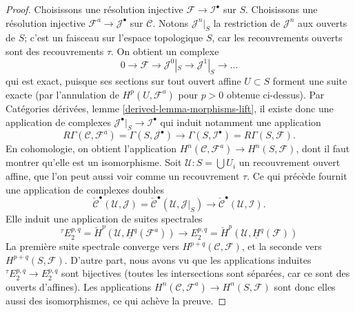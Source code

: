 \begin{proof}
\medskip\noindent
Choisissons une résolution injective
$\mathcal{F} \to \mathcal{I}^\bullet$ sur $S$. Choisissons une
résolution injective $\mathcal{F}^a \to \mathcal{J}^\bullet$
sur $\mathcal{C}$.
Notons $\mathcal{J}^n|_S$ la restriction de $\mathcal{J}^n$ aux ouverts
de $S$; c'est un faisceau sur l'espace topologique $S$, car les
recouvrements ouverts sont des recouvrements $\tau$. On obtient un
complexe
$$
0 \to \mathcal{F} \to \mathcal{J}^0|_S \to \mathcal{J}^1|_S \to \ldots
$$
qui est exact, puisque ses sections sur tout ouvert affine $U \subset S$
forment une suite exacte (par l'annulation de
$H^p(U, \mathcal{F}^a)$ pour $p > 0$ obtenue ci-dessus). Par Catégories
dérivées, lemme \ref{derived-lemma-morphisms-lift}, il existe donc une
application de complexes
$\mathcal{J}^\bullet|_S \to \mathcal{I}^\bullet$ qui induit notamment
une application
$$
R\Gamma(\mathcal{C}, \mathcal{F}^a)
=
\Gamma(S, \mathcal{J}^\bullet)
\longrightarrow
\Gamma(S, \mathcal{I}^\bullet)
=
R\Gamma(S, \mathcal{F}).
$$
En cohomologie, on obtient l'application
$H^n(\mathcal{C}, \mathcal{F}^a) \to H^n(S, \mathcal{F})$, dont il faut
montrer qu'elle est un isomorphisme. Soit
$\mathcal{U} : S = \bigcup U_i$ un recouvrement ouvert affine, que l'on
peut aussi voir comme un recouvrement $\tau$. Ce qui précède fournit une
application de complexes doubles
$$
\check{\mathcal{C}}^\bullet(\mathcal{U}, \mathcal{J})
=
\check{\mathcal{C}}^\bullet(\mathcal{U}, \mathcal{J}|_S)
\longrightarrow
\check{\mathcal{C}}^\bullet(\mathcal{U}, \mathcal{I}).
$$
Elle induit une application de suites spectrales
$$
{}^\tau\! E_2^{p, q} = \check{H}^p(\mathcal{U}, \underline{H}^q(\mathcal{F}^a))
\longrightarrow
E_2^{p, q} = \check{H}^p(\mathcal{U}, \underline{H}^q(\mathcal{F}))
$$
La première suite spectrale converge vers
$H^{p + q}(\mathcal{C}, \mathcal{F})$, et la seconde vers
$H^{p + q}(S, \mathcal{F})$. D'autre part, nous avons vu que les
applications induites ${}^\tau\! E_2^{p, q} \to E_2^{p, q}$ sont
bijectives (toutes les intersections sont séparées, car ce sont des
ouverts d'affines). Les applications
$H^n(\mathcal{C}, \mathcal{F}^a) \to H^n(S, \mathcal{F})$ sont donc elles
aussi des isomorphismes, ce qui achève la preuve.
\end{proof}

